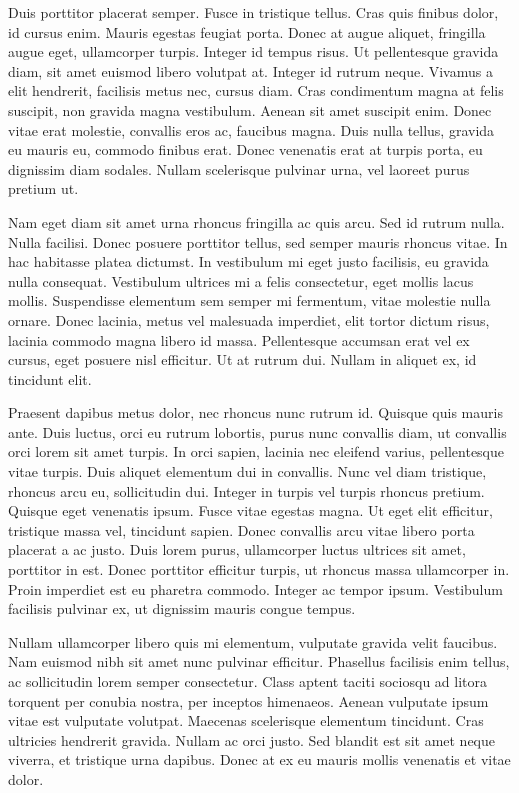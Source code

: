 \documentclass{VUMIFPSkursinis}
\begin{document}
Duis porttitor placerat semper. Fusce in tristique tellus. Cras quis finibus dolor, id cursus enim. Mauris egestas feugiat porta. Donec at augue aliquet, fringilla augue eget, ullamcorper turpis. Integer id tempus risus. Ut pellentesque gravida diam, sit amet euismod libero volutpat at. Integer id rutrum neque. Vivamus a elit hendrerit, facilisis metus nec, cursus diam. Cras condimentum magna at felis suscipit, non gravida magna vestibulum. Aenean sit amet suscipit enim. Donec vitae erat molestie, convallis eros ac, faucibus magna. Duis nulla tellus, gravida eu mauris eu, commodo finibus erat. Donec venenatis erat at turpis porta, eu dignissim diam sodales. Nullam scelerisque pulvinar urna, vel laoreet purus pretium ut.

Nam eget diam sit amet urna rhoncus fringilla ac quis arcu. Sed id rutrum nulla. Nulla facilisi. Donec posuere porttitor tellus, sed semper mauris rhoncus vitae. In hac habitasse platea dictumst. In vestibulum mi eget justo facilisis, eu gravida nulla consequat. Vestibulum ultrices mi a felis consectetur, eget mollis lacus mollis. Suspendisse elementum sem semper mi fermentum, vitae molestie nulla ornare. Donec lacinia, metus vel malesuada imperdiet, elit tortor dictum risus, lacinia commodo magna libero id massa. Pellentesque accumsan erat vel ex cursus, eget posuere nisl efficitur. Ut at rutrum dui. Nullam in aliquet ex, id tincidunt elit.

Praesent dapibus metus dolor, nec rhoncus nunc rutrum id. Quisque quis mauris ante. Duis luctus, orci eu rutrum lobortis, purus nunc convallis diam, ut convallis orci lorem sit amet turpis. In orci sapien, lacinia nec eleifend varius, pellentesque vitae turpis. Duis aliquet elementum dui in convallis. Nunc vel diam tristique, rhoncus arcu eu, sollicitudin dui. Integer in turpis vel turpis rhoncus pretium. Quisque eget venenatis ipsum. Fusce vitae egestas magna. Ut eget elit efficitur, tristique massa vel, tincidunt sapien. Donec convallis arcu vitae libero porta placerat a ac justo. Duis lorem purus, ullamcorper luctus ultrices sit amet, porttitor in est. Donec porttitor efficitur turpis, ut rhoncus massa ullamcorper in. Proin imperdiet est eu pharetra commodo. Integer ac tempor ipsum. Vestibulum facilisis pulvinar ex, ut dignissim mauris congue tempus.

Nullam ullamcorper libero quis mi elementum, vulputate gravida velit faucibus. Nam euismod nibh sit amet nunc pulvinar efficitur. Phasellus facilisis enim tellus, ac sollicitudin lorem semper consectetur. Class aptent taciti sociosqu ad litora torquent per conubia nostra, per inceptos himenaeos. Aenean vulputate ipsum vitae est vulputate volutpat. Maecenas scelerisque elementum tincidunt. Cras ultricies hendrerit gravida. Nullam ac orci justo. Sed blandit est sit amet neque viverra, et tristique urna dapibus. Donec at ex eu mauris mollis venenatis et vitae dolor. 
\end{document}
